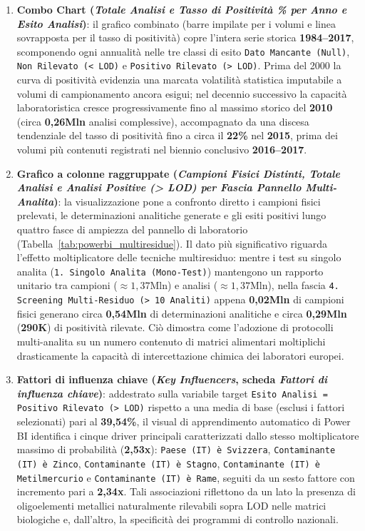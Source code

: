 \begin{enumerate}
    \item \textbf{Combo Chart (\textit{Totale Analisi e Tasso di Positività \% per Anno e Esito Analisi})}: il grafico combinato (barre impilate per i volumi e linea sovrapposta per il tasso di positività) copre l'intera serie storica \textbf{1984--2017}, scomponendo ogni annualità nelle tre classi di esito \texttt{Dato Mancante (Null)}, \texttt{Non Rilevato (\textless{} LOD)} e \texttt{Positivo Rilevato (\textgreater{} LOD)}. Prima del 2000 la curva di positività evidenzia una marcata volatilità statistica imputabile a volumi di campionamento ancora esigui; nel decennio successivo la capacità laboratoristica cresce progressivamente fino al massimo storico del \textbf{2010} (circa \textbf{0,26Mln} analisi complessive), accompagnato da una discesa tendenziale del tasso di positività fino a circa il \textbf{22\%} nel \textbf{2015}, prima dei volumi più contenuti registrati nel biennio conclusivo \textbf{2016--2017}.

    \item \textbf{Grafico a colonne raggruppate (\textit{Campioni Fisici Distinti, Totale Analisi e Analisi Positive (\textgreater{} LOD) per Fascia Pannello Multi-Analita})}: la visualizzazione pone a confronto diretto i campioni fisici prelevati, le determinazioni analitiche generate e gli esiti positivi lungo quattro fasce di ampiezza del pannello di laboratorio (Tabella~\ref{tab:powerbi_multiresidue}). Il dato più significativo riguarda l'effetto moltiplicatore delle tecniche multiresiduo: mentre i test su singolo analita (\texttt{1. Singolo Analita (Mono-Test)}) mantengono un rapporto unitario tra campioni ($\approx 1,37\text{Mln}$) e analisi ($\approx 1,37\text{Mln}$), nella fascia \texttt{4. Screening Multi-Residuo (\textgreater{} 10 Analiti)} appena \textbf{0,02Mln} di campioni fisici generano circa \textbf{0,54Mln} di determinazioni analitiche e circa \textbf{0,29Mln} (\textbf{290K}) di positività rilevate. Ciò dimostra come l'adozione di protocolli multi-analita su un numero contenuto di matrici alimentari moltiplichi drasticamente la capacità di intercettazione chimica dei laboratori europei.

    \item \textbf{Fattori di influenza chiave (\textit{Key Influencers}, scheda \textit{Fattori di influenza chiave})}: addestrato sulla variabile target \texttt{Esito Analisi = Positivo Rilevato (\textgreater{} LOD)} rispetto a una media di base (esclusi i fattori selezionati) pari al \textbf{39,54\%}, il visual di apprendimento automatico di Power BI identifica i cinque driver principali caratterizzati dallo stesso moltiplicatore massimo di probabilità (\textbf{2,53x}): \texttt{Paese (IT) è Svizzera}, \texttt{Contaminante (IT) è Zinco}, \texttt{Contaminante (IT) è Stagno}, \texttt{Contaminante (IT) è Metilmercurio} e \texttt{Contaminante (IT) è Rame}, seguiti da un sesto fattore con incremento pari a \textbf{2,34x}. Tali associazioni riflettono da un lato la presenza di oligoelementi metallici naturalmente rilevabili sopra LOD nelle matrici biologiche e, dall'altro, la specificità dei programmi di controllo nazionali.


\end{enumerate}
